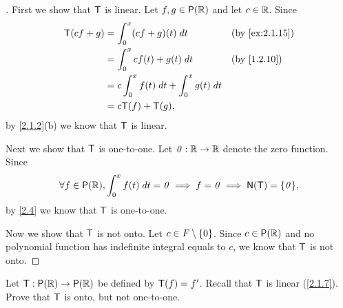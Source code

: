 \begin{proof}[]
  First we show that \(\mathsf{T}\) is linear.
  Let \(f, g \in \ps{\R}\) and let \(c \in \mathbb{R}\).
  Since
  \begin{align*}
    \T(cf + g) & = \int_0^x (cf + g)(t) \; dt                  &  & \text{(by \cref{ex:2.1.15})} \\
               & = \int_0^x cf(t) + g(t) \; dt                 &  & \text{(by \cref{1.2.10})}    \\
               & = c \int_0^x f(t) \; dt + \int_0^x g(t) \; dt                                   \\
               & = c \T(f) + \T(g),
  \end{align*}
  by \cref{2.1.2}(b) we know that \(\mathsf{T}\) is linear.

  Next we show that \(\mathsf{T}\) is one-to-one.
  Let \(\mathit{0} : \mathbb{R} \to \mathbb{R}\) denote the zero function.
  Since
  \[
    \forall f \in \ps{\R}, \int_0^x f(t) \; dt = \zv \implies f = \zv \implies \ns{\T} = \set{\zv},
  \]
  by \cref{2.4} we know that \(\mathsf{T}\) is one-to-one.

  Now we show that \(\mathsf{T}\) is not onto.
  Let \(c \in \mathit{F} \setminus \left\lbrace0\right\rbrace\).
  Since \(c \in \ps{\R}\) and no polynomial function has indefinite integral equals to \(c\), we know that \(\mathsf{T}\) is not onto.
\end{proof}

\begin{ex}\label{ex:2.1.16}
  Let \(\T : \ps{\R} \to \ps{\R}\) be defined by \(\mathsf{T}(f) = f'\).
  Recall that \(\mathsf{T}\) is linear (\cref{2.1.7}).
  Prove that \(\mathsf{T}\) is onto, but not one-to-one.
\end{ex}

